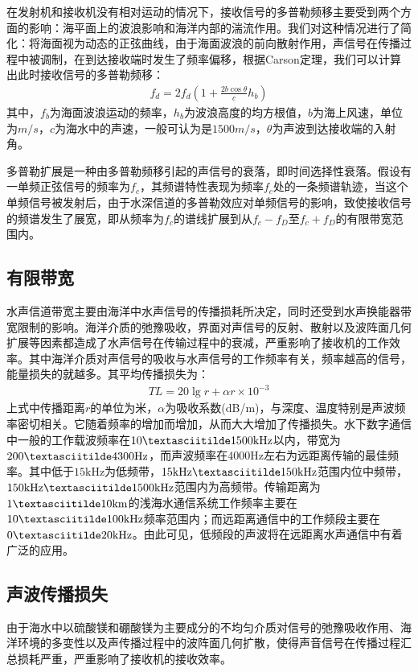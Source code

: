 在发射机和接收机没有相对运动的情况下，接收信号的多普勒频移主要受到两个方面的影响：海平面上的波浪影响和海洋内部的湍流作用。我们对这种情况进行了简化：将海面视为动态的正弦曲线，由于海面波浪的前向散射作用，声信号在传播过程中被调制，在到达接收端时发生了频率偏移，根据Carson定理，我们可以计算出此时接收信号的多普勒频移：
\begin{eqnarray}
    f_d=2f_d\left(1+\frac{2b\cos\theta}{c}h_b\right)
    \label{equ:2.5}
\end{eqnarray}
其中，$f_b$为海面波浪运动的频率，$h_b$为波浪高度的均方根值，$b$为海上风速，单位为$m/s$，$c$为海水中的声速，一般可认为是$1500m/s$，$\theta$为声波到达接收端的入射角。

多普勒扩展是一种由多普勒频移引起的声信号的衰落，即时间选择性衰落。假设有一单频正弦信号的频率为$f_c$，其频谱特性表现为频率$f_c$处的一条频谱轨迹，当这个单频信号被发射后，由于水深信道的多普勒效应对单频信号的影响，致使接收信号的频谱发生了展宽，即从频率为$f_c$的谱线扩展到从$f_c-f_D$至$f_c+f_D$的有限带宽范围内。
\subsection{有限带宽}
水声信道带宽主要由海洋中水声信号的传播损耗所决定，同时还受到水声换能器带宽限制的影响。海洋介质的弛豫吸收\citep{Essebbar1994}，界面对声信号的反射、散射以及波阵面几何扩展等因素都造成了水声信号在传输过程中的衰减，严重影响了接收机的工作效率。其中海洋介质对声信号的吸收与水声信号的工作频率有关，频率越高的信号，能量损失的就越多。其平均传播损失为：
\begin{eqnarray}
    TL=20\lg r+\alpha r\times10^{-3}
    \label{equ:2.6}
\end{eqnarray}
上式中传播距离$r$的单位为米，$\alpha$为吸收系数(dB/m)，与深度、温度特别是声波频率密切相关。它随着频率的增加而增加，从而大大增加了传播损失。水下数字通信中一般的工作载波频率在$10\textasciitilde
1500\mbox{kHz}$以内，带宽为$200\textasciitilde
4300\mbox{Hz}$，而声波频率在$4000\mbox{Hz}$左右为远距离传输的最佳频率。其中低于$15\mbox{kHz}$为低频带，$15\mbox{kHz}\textasciitilde
150\mbox{kHz}$范围内位中频带，$150\mbox{kHz}\textasciitilde
1500\mbox{kHz}$范围内为高频带。传输距离为$1\textasciitilde10\mbox{km}$的浅海水通信系统工作频率主要在$10\textasciitilde
100\mbox{kHz}$频率范围内；而远距离通信中的工作频段主要在$0\textasciitilde
20\mbox{kHz}$。由此可见，低频段的声波将在远距离水声通信中有着广泛的应用。
\subsection{声波传播损失}
由于海水中以硫酸镁和硼酸镁为主要成分的不均匀介质对信号的弛豫吸收作用、海洋环境的多变性以及声传播过程中的波阵面几何扩散，使得声音信号在传播过程汇总损耗严重，严重影响了接收机的接收效率。

